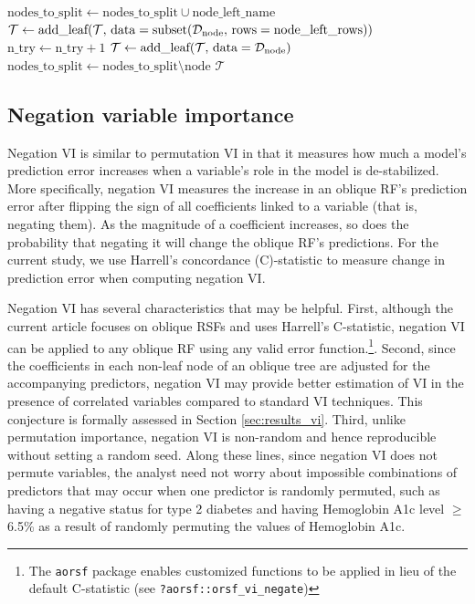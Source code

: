 \documentclass[twoside,11pt]{article}\usepackage[]{graphicx}\usepackage[]{xcolor}
\newcommand{\dataset}{{\cal D}}
\newcommand{\ie}{that is}
\newcommand{\secref}[1]{Section \ref{#1}}
\begin{document}
\begin{algorithm}
\begin{algorithmic}[1]
           \State $\text{nodes\_to\_split} \gets \text{nodes\_to\_split} \cup \text{node\_left\_name}$
         \Else
           \State $\mathcal{T} \gets \text{add\_leaf}(\mathcal{T},\, \text{data} = \text{subset}(\dataset_{\text{node}},\,\text{rows} = \text{node\_left\_rows}))$
         \EndIf
         \State $\text{n\_try} \gets \text{n\_try} + 1$
         \State {}
       \Else
         \State $\mathcal{T} \gets \text{add\_leaf}(\mathcal{T},\, \text{data} =\dataset_{\text{node}})$
       \EndIf
       \State $\text{nodes\_to\_split} \gets \text{nodes\_to\_split} \setminus \text{node}$
     \EndFor
  \State \Return $\mathcal{T}$
  \end{algorithmic}
\end{algorithm}

\subsection{Negation variable importance}

Negation VI is similar to permutation VI in that it measures how much a model’s prediction error increases when a variable’s role in the model is de-stabilized. More specifically, negation VI measures the increase in an oblique RF's prediction error after flipping the sign of all coefficients linked to a variable (\ie, negating them). As the magnitude of a coefficient increases, so does the probability that negating it will change the oblique RF's predictions. For the current study, we use Harrell's concordance (C)-statistic \citep{harrell1982evaluating} to measure change in prediction error when computing negation VI.

Negation VI has several characteristics that may be helpful. First, although the current article focuses on oblique RSFs and uses Harrell's C-statistic, negation VI can be applied to any oblique RF using any valid error function.\footnote{The \texttt{aorsf} package enables customized functions to be applied in lieu of the default C-statistic (see \texttt{?aorsf::orsf\_vi\_negate})}. Second, since the coefficients in each non-leaf node of an oblique tree are adjusted for the accompanying predictors, negation VI may provide better estimation of VI in the presence of correlated variables compared to standard VI techniques. This conjecture is formally assessed in \secref{sec:results_vi}. Third, unlike permutation importance, negation VI is non-random and hence reproducible without setting a random seed. Along these lines, since negation VI does not permute variables, the analyst need not worry about impossible combinations of predictors that may occur when one predictor is randomly permuted, such as having a negative status for type 2 diabetes and having Hemoglobin A1c level $\geq$ 6.5\% as a result of randomly permuting the values of Hemoglobin A1c.
\end{document}

